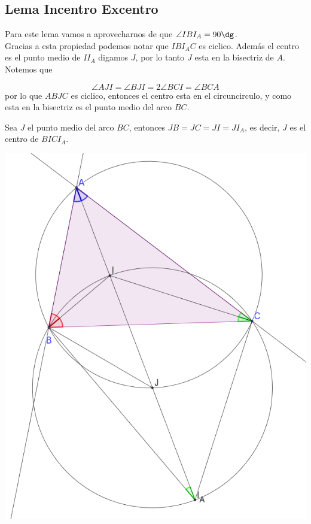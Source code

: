 \documentclass[11pt]{scrartcl}
\begin{document}
\subsection{Lema Incentro Excentro}

Para este lema vamos a aprovecharnos de que $\angle IBI_A=90\dg$. \\

Gracias a esta propiedad podemos notar que $IBI_AC$ es ciclico. Adem\'as el 
centro es el punto medio de $II_A$ digamos $J$, por lo tanto $J$ esta en la bisectriz de $A$. \\
Notemos que 

\[\angle AJI= \angle BJI = 2 \angle BCI = \angle BCA\] 
por lo que $ABJC$ es ciclico, entonces el centro 
esta en el circuncirculo, y como esta en la bisectriz es el punto medio del arco $BC$. 

\begin{lemma} 
    Sea $J$ el punto medio del arco $BC$, entonces $JB=JC=JI=JI_A$, es decir, $J$ es el centro de $BICI_A$.
\end{lemma}

\begin{center}
        \includegraphics[scale=0.6]{PNAC14.png}
    \end{center}
\end{document}
